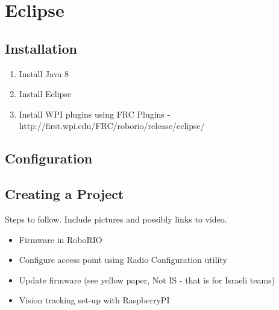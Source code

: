 \chapter{Eclipse}


\section{Installation}

\begin{enumerate}
\item Install Java 8
\item Install Eclipse
\item Install WPI plugins using FRC Plugins - http://first.wpi.edu/FRC/roborio/release/eclipse/
\end{enumerate}



\section{Configuration}



\section{Creating a Project}




Steps to follow. Include pictures and possibly links to video.

\begin{itemize}
	\item Firmware in RoboRIO
	\item Configure access point using Radio Configuration utility
	\item Update firmware (see yellow paper, Not IS - that is for Israeli teams)
	\item Vision tracking set-up with RaspberryPI
\end{itemize}
